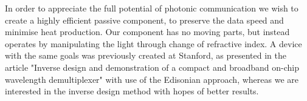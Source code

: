 In order to appreciate the full potential of photonic communication we wish to create a highly efficient passive component, to preserve the data speed and minimise heat production. Our component has no moving parts, but instead operates by manipulating the light through change of refractive index. A device with the same goals was previously created at Stanford, as presented in the article "Inverse design and demonstration of a compact and broadband on-chip wavelength demultiplexer" \cite{Stanford} with use of the Edisonian approach, whereas we are interested in the inverse design method with hopes of better results. 


